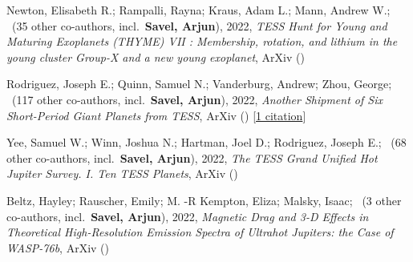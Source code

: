 \item[{\color{numcolor}\scriptsize4}] Newton, Elisabeth R.; Rampalli, Rayna; Kraus, Adam L.; Mann, Andrew W.; \etal\ ({35} other co-authors, incl.\ \textbf{Savel, Arjun}), 2022, \emph{TESS Hunt for Young and Maturing Exoplanets (THYME) VII : Membership, rotation, and lithium in the young cluster Group-X and a new young exoplanet}, ArXiv ()

\item[{\color{numcolor}\scriptsize3}] Rodriguez, Joseph E.; Quinn, Samuel N.; Vanderburg, Andrew; Zhou, George; \etal\ ({117} other co-authors, incl.\ \textbf{Savel, Arjun}), 2022, \emph{Another Shipment of Six Short-Period Giant Planets from TESS}, ArXiv () [\href{https://ui.adsabs.harvard.edu/abs/2022arXiv220505709R}{1 citation}]

\item[{\color{numcolor}\scriptsize2}] Yee, Samuel W.; Winn, Joshua N.; Hartman, Joel D.; Rodriguez, Joseph E.; \etal\ ({68} other co-authors, incl.\ \textbf{Savel, Arjun}), 2022, \emph{The TESS Grand Unified Hot Jupiter Survey. I. Ten TESS Planets}, ArXiv ()

\item[{\color{numcolor}\scriptsize1}] Beltz, Hayley; Rauscher, Emily; M. -R Kempton, Eliza; Malsky, Isaac; \etal\ ({3} other co-authors, incl.\ \textbf{Savel, Arjun}), 2022, \emph{Magnetic Drag and 3-D Effects in Theoretical High-Resolution Emission Spectra of Ultrahot Jupiters: the Case of WASP-76b}, ArXiv ()